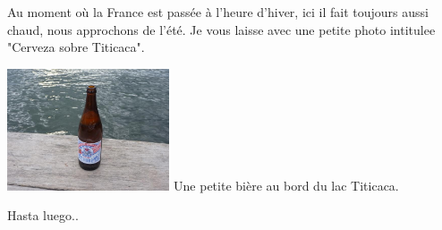 \begin{multicols}{2}
Au moment où la France est passée à l'heure d'hiver, ici il fait toujours aussi chaud, nous approchons de l'été. Je vous laisse avec une petite photo intitulee "Cerveza sobre Titicaca".

\hspace*{-0.65cm}
\includegraphics[width=4.8cm]{articles/Arequipa-colca-titicaca/1256606978ASqj.jpg}
Une petite bière au bord du lac Titicaca.

Hasta luego..

\end{multicols}


